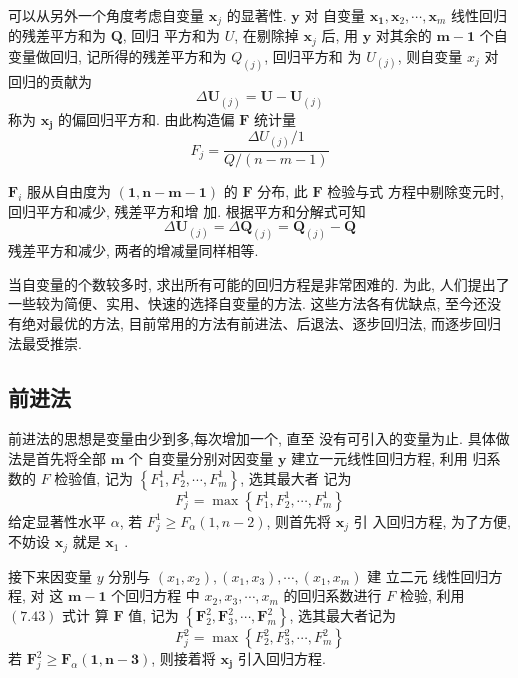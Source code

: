 可以从另外一个角度考虑自变量 \( \boldsymbol{x}_{j} \) 的显著性.  \( \boldsymbol{y} \) 对 自变量 \( \boldsymbol{x}_{\mathbf{1}}, \boldsymbol{x}_{2}, \cdots, \boldsymbol{x}_{m} \) 线性回归的残差平方和为 \( \boldsymbol{Q} \), 回归
平方和为 \( U \), 在剔除掉 \( \boldsymbol{x}_{j} \) 后, 用 \( \boldsymbol{y} \) 对其余的 \( \boldsymbol{m}-\mathbf{1} \) 个自变量做回归, 记所得的残差平方和为 $ Q_{(j)} $, 回归平方和
为 \( U_{(j)} \), 则自变量 \( x_{j} \) 对回归的贡献为
$$
\Delta \boldsymbol{U}_{(j)}=\boldsymbol{U}-\boldsymbol{U}_{(j)}
$$
称为 \( \boldsymbol{x}_{\boldsymbol{j}} \) 的偏回归平方和. 由此构造偏 \( \boldsymbol{F} \) 统计量
$$
F_{j}=\frac{\Delta U_{(j)} / 1}{Q /(n-m-1)}
$$

\( \boldsymbol{F}_{i} \) 服从自由度为 \( (\mathbf{1}, \boldsymbol{n}-\boldsymbol{m}-\mathbf{1}) \) 的 \( \boldsymbol{F} \) 分布, 此 \( \boldsymbol{F} \) 检验与式
方程中剔除变元时, 回归平方和减少, 残差平方和增 加. 根据平方和分解式可知
$$
\Delta \boldsymbol{U}_{(j)}=\Delta \boldsymbol{Q}_{(j)}=\boldsymbol{Q}_{(j)}-\boldsymbol{Q}
$$
残差平方和减少, 两者的增减量同样相等. 

当自变量的个数较多时, 求出所有可能的回归方程是非常困难的. 为此, 人们提出了一些较为简便、实用、快速的选择自变量的方法. 这些方法各有优缺点, 至今还没有绝对最优的方法, 目前常用的方法有前进法、后退法、逐步回归法, 而逐步回归法最受推崇. 

\subsection{前进法}

前进法的思想是变量由少到多,每次增加一个, 直至
没有可引入的变量为止. 具体做法是首先将全部 \( \boldsymbol{m} \) 个 自变量分别对因变量 \( \boldsymbol{y} \) 建立一元线性回归方程, 利用
归系数的 \( F \) 检验值, 记为 \( \left\{F_{1}^{1}, F_{2}^{1}, \cdots, F_{m}^{1}\right\} \), 选其最大者 记为
$$
F_{j}^{1}=\max \left\{F_{1}^{1}, F_{2}^{1}, \cdots, F_{m}^{1}\right\}
$$
给定显著性水平 \( \alpha \), 若 \( F_{j}^{1} \geq F_{\alpha}(1, n-2) \), 则首先将 \( \boldsymbol{x}_{j} \) 引 入回归方程, 为了方便, 不妨设 \( \boldsymbol{x}_{j} \) 就是 \( \boldsymbol{x}_{1} \) . 

接下来因变量 \( y \) 分别与 \( \left(x_{1}, x_{2}\right),\left(x_{1}, x_{3}\right), \cdots,\left(x_{1}, x_{m}\right) \) 建
立二元 线性回归方程, 对 这 \( \boldsymbol{m}-\mathbf{1} \) 个回归方程 中 \( x_{2}, x_{3}, \cdots, x_{m} \) 的回归系数进行 \( F \) 检验, 利用 \( (7.43) \) 式计 算 \( \boldsymbol{F} \) 值, 记为 \( \left\{\boldsymbol{F}_{2}^{2}, \boldsymbol{F}_{3}^{2}, \cdots, \boldsymbol{F}_{m}^{2}\right\} \), 选其最大者记为
$$
F_{j}^{2}=\max \left\{F_{2}^{2}, F_{3}^{2}, \cdots, F_{m}^{2}\right\}
$$
若 \( \boldsymbol{F}_{j}^{2} \geq \boldsymbol{F}_{\alpha} \mathbf{( 1 , n - 3 )} \), 则接着将 \( \boldsymbol{x}_{\boldsymbol{j}} \) 引入回归方程. 

